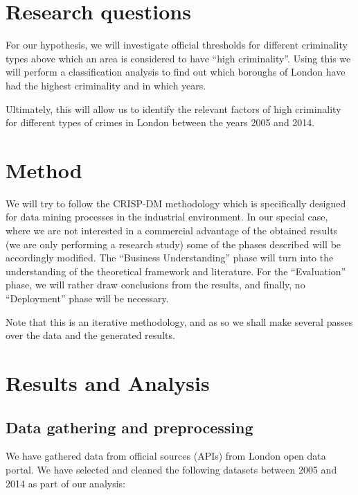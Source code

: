 \documentclass[12pt, openany]{report}
\begin{document}
\section{Research questions}

For our hypothesis, we will investigate official thresholds for different criminality types above which an area is considered to have “high criminality”. Using this we will perform a classification analysis to find out which boroughs of London have had the highest criminality and in which years.

Ultimately, this will allow us to identify the relevant factors of high criminality for different types of crimes in London between the years 2005 and 2014.

\section{Method}

We will try to follow the CRISP-DM methodology \cite{shearer00} which is specifically designed for data mining processes in the industrial environment. In our special case, where we are not interested in a commercial advantage of the obtained results (we are only performing a research study) some of the phases described will be accordingly modified. The “Business Understanding” phase will turn into the understanding of the theoretical framework and literature. For the “Evaluation” phase, we will rather draw conclusions from the results, and finally, no “Deployment” phase will be necessary.

Note that this is an iterative methodology, and as so we shall make several passes over the data and the generated results.

\section{Results and Analysis}


\subsection{Data gathering and preprocessing}

We have gathered data from official sources (APIs) from London open data portal. We have selected and cleaned the following datasets between 2005 and 2014 as part of our analysis:
\end{document}
